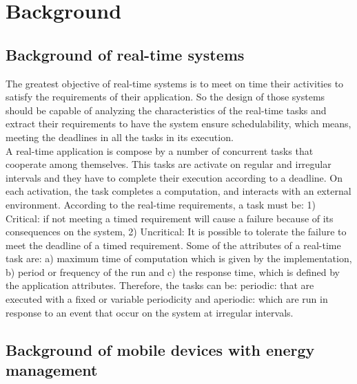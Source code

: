 \documentclass[conference]{IEEEtran}
\begin{document}
\section{Background}
\subsection{Background of real-time systems}
The greatest objective of real-time systems is to meet on time their activities to satisfy the requirements of their application. So the design of those systems should be capable of analyzing the characteristics of the real-time tasks and extract their requirements to have the system ensure schedulability, which means, meeting the deadlines in all the tasks in its execution.\\
A real-time application is compose by a number of concurrent tasks that cooperate among themselves.  This tasks are activate  on regular and irregular intervals and they have to complete their execution according to a deadline. On each activation, the task completes a computation, and interacts with an external environment. According to the real-time requirements, a task must be: 1) Critical: if not meeting a timed requirement will cause a failure because of its consequences on the system, 2) Uncritical: It is possible to tolerate the failure to meet the deadline of a timed requirement. Some of the attributes of a real-time task are: a) maximum time of computation which is given by the implementation, b) period or frequency of the run and c) the response time, which is defined by the application attributes. Therefore, the tasks can be: periodic: that are executed with a fixed or variable periodicity and aperiodic: which are run in response to an event that occur on the system at irregular intervals.
 
 \subsection{Background of mobile devices with energy management}
\end{document}
